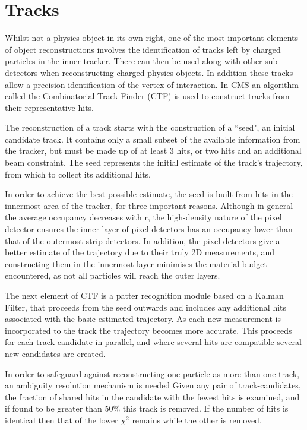  
\section{Tracks}

Whilst not a physics object in its own right, one of the most important elements of object reconstructions involves the identification of tracks left by charged particles in the inner tracker. There can then be used along with other sub detectors when reconstructing charged physics objects. In addition these tracks allow a precision identification of the vertex of interaction. In CMS an algorithm called the Combinatorial Track Finder (CTF) is used to construct tracks from their representative hits. 

The reconstruction of a track starts with the construction of a ``seed", an initial candidate track. It contains only a small subset of the available information from the tracker, but must be made up of at least 3 hits, or two hits and an additional beam constraint. The seed represents the initial estimate of the track's trajectory, from which to collect its additional hits. 

In order to achieve the best possible estimate, the seed is built from hits in the innermost area of the tracker, for three important reasons. Although in general the average occupancy decreases with r, the high-density nature of the pixel detector ensures the inner layer of pixel detectors has an occupancy lower than that of the outermost strip detectors. In addition, the pixel detectors give a better estimate of the trajectory due to their truly 2D measurements, and constructing them in the innermost layer minimises the material budget encountered, as not all particles will reach the outer layers. 

The next element of CTF is a patter recognition module based on a Kalman Filter, that proceeds from the seed outwards and includes any additional hits associated with the basic estimated trajectory. As each new measurement is incorporated to the track the trajectory becomes more accurate. This proceeds for each track candidate in parallel, and where several hits are compatible several new candidates are created. 

In order to safeguard against reconstructing one particle as more than one track, an ambiguity resolution mechanism is needed Given any pair of track-candidates, the fraction of shared hits in the candidate with the fewest hits is examined, and if found to be greater than 50$\%$ this track is removed. If the number of hits is identical then that of the lower $\chi^{2}$ remains while the other is removed. 


